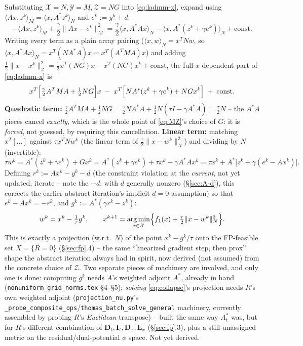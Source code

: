 \documentclass[11pt]{article}
\newcommand{\code}[1]{\texttt{#1}}
\DeclareMathOperator*{\argmin}{arg\,min}
\begin{document}
Substituting $\mathcal X=N,\mathcal Y=M,\mathcal Z=NG$ into \eqref{eq:ladmm-x}, expand
using $\langle Ax,z^k\rangle_M=\langle x,A^*z^k\rangle_N$ and $e^k:=y^k+d$:
\[
  -\langle Ax,z^k\rangle_M+\frac\gamma2\|Ax-e^k\|_M^2
  = \frac\gamma2\langle x,A^*Ax\rangle_N - \langle x,A^*(z^k+\gamma e^k)\rangle_N
  + \text{const}.
\]
Writing every term as a plain array pairing ($\langle x,w\rangle_N=x^TNw$, so
$\langle x,A^*Ax\rangle_N=x^T(NA^*A)x=x^T(A^TMA)x$) and adding $\tfrac12\|x-x^k\|_\mathcal
Z^2=\tfrac12x^T(NG)x-x^T(NG)x^k+\text{const}$, the full $x$-dependent part of
\eqref{eq:ladmm-x} is
\[
  x^T\Bigl[\tfrac\gamma2A^TMA+\tfrac12NG\Bigr]x
  \;-\; x^T\Bigl[NA^*(z^k+\gamma e^k)+NGx^k\Bigr] \;+\; \text{const}.
\]
\textbf{Quadratic term:} $\tfrac\gamma2A^TMA+\tfrac12NG=\tfrac\gamma2NA^*A+\tfrac12N(\tau
I-\gamma A^*A)=\tfrac\tau2N$ -- the $A^*A$ pieces cancel \emph{exactly}, which is the whole
point of \eqref{eq:MZ}'s choice of $G$: it is \emph{forced}, not guessed, by requiring
this cancellation.
\textbf{Linear term:} matching $x^T[\ldots]$ against $\tau x^TNw^k$ (the linear term of
$\tfrac\tau2\|x-w^k\|_N^2$) and dividing by $N$ (invertible):
\[
  \tau w^k = A^*(z^k+\gamma e^k) + Gx^k
  = A^*(z^k+\gamma e^k) + \tau x^k - \gamma A^*Ax^k
  = \tau x^k + A^*\bigl[z^k+\gamma(e^k-Ax^k)\bigr].
\]
Defining $r^k:=Ax^k-y^k-d$ (the constraint violation at the \emph{current}, not yet
updated, iterate -- note the $-d$: with $d$ generally nonzero (\S\ref{sec:A-d}), this
corrects the earlier abstract iteration's implicit $d=0$ assumption) so that
$e^k-Ax^k=-r^k$, and $g^k:=A^*(\gamma r^k-z^k)$:
\begin{equation}
  \label{eq:collapse}
  w^k = x^k - \tfrac1\tau g^k, \qquad
  x^{k+1} = \argmin_{x\in\mathcal X}\Bigl\{f_1(x) + \tfrac\tau2\|x-w^k\|_N^2\Bigr\}.
\end{equation}
This is exactly a projection (w.r.t.\ $N$) of the point $x^k-g^k/\tau$ onto the
FP-feasible set $X=\{R=0\}$ (\S\ref{sec:fp}.4) -- the same ``linearized gradient step,
then prox'' shape the abstract iteration always had in spirit, now derived (not assumed)
from the concrete choice of $\mathcal Z$. Two separate pieces of machinery are involved,
and only one is done: computing $g^k$ needs $A$'s weighted adjoint $A^*$, already in hand
(\code{nonuniform\_grid\_norms.tex} \S4--\S5); \emph{solving} \eqref{eq:collapse}'s
projection needs $R$'s own weighted adjoint (\code{projection\_nu.py}'s
\code{\_probe\_composite\_ops}/\code{thomas\_batch\_solve\_general} machinery, currently
assembled by probing $R$'s \emph{Euclidean} transpose) -- built the same way $A_t^*$ was,
but for $R$'s different combination of $\mathbf D_t,\bar{\mathbf I}_t,\mathbf D_x,\mathbf
L_x$ (\S\ref{sec:fp}.3), plus a still-unassigned metric on the residual/dual-potential
$\phi$ space. Not yet derived.
\end{document}
